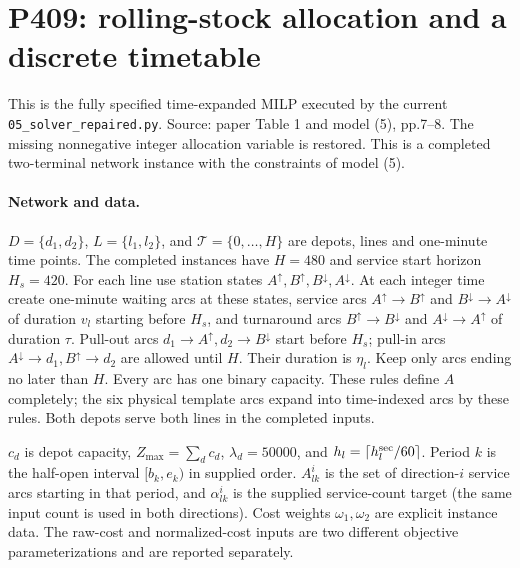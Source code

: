 \documentclass[11pt]{article}
\begin{document}
\section*{P409: rolling-stock allocation and a discrete timetable}
This is the fully specified time-expanded MILP executed by the current
\texttt{05\_solver\_repaired.py}. Source: paper Table 1 and model (5), pp.7--8.
The missing nonnegative integer allocation variable is restored. This is a
completed two-terminal network instance with the constraints of model (5).

\paragraph{Network and data.}
$D=\{d_1,d_2\}$, $L=\{l_1,l_2\}$, and
$\mathcal T=\{0,\ldots,H\}$ are depots, lines and one-minute time points.
The completed instances have $H=480$ and service start horizon $H_s=420$.
For each line use station states $A^\uparrow,B^\uparrow,
B^\downarrow,A^\downarrow$.
At each integer time create one-minute waiting arcs at these states,
service arcs $A^\uparrow\to B^\uparrow$ and
$B^\downarrow\to A^\downarrow$ of duration $v_l$ starting before $H_s$,
and turnaround arcs $B^\uparrow\to B^\downarrow$ and
$A^\downarrow\to A^\uparrow$ of duration $\tau$.
Pull-out arcs $d_1\to A^\uparrow,d_2\to B^\downarrow$ start before
$H_s$; pull-in arcs $A^\downarrow\to d_1,B^\uparrow\to d_2$
are allowed until $H$. Their duration is $\eta_l$.
Keep only arcs ending no later than $H$.
Every arc has one binary capacity. These rules define $A$ completely;
the six physical template arcs expand into time-indexed arcs by these rules.
Both depots serve both lines in the completed inputs.

$c_d$ is depot capacity, $Z_{\max}=\sum_dc_d$,
$\lambda_d=50000$, and $h_l=\lceil h_l^{\rm sec}/60\rceil$.
Period $k$ is the half-open interval $[b_k,e_k)$ in supplied order.
$A^i_{lk}$ is the set of direction-$i$ service arcs starting in that
period, and $\alpha^i_{lk}$ is the supplied service-count target
(the same input count is used in both directions).
Cost weights $\omega_1,\omega_2$ are explicit instance data.
The raw-cost and normalized-cost inputs are two different objective
parameterizations and are reported separately.
\end{document}
